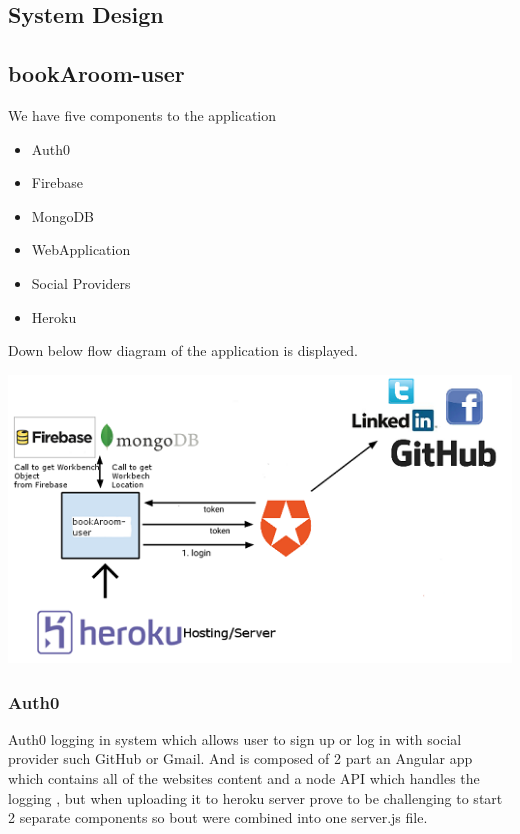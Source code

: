 \begin{itemize}
\chapter{System Design}
\section{bookAroom-user}
\bigbreak

We have five components to the application

\begin{itemize}
	\item Auth0
	\item Firebase
	\item MongoDB
	\item WebApplication 
	\item Social Providers
	\item Heroku
\end{itemize}
\bigbreak

Down below flow diagram of the application is displayed.

\begin{center}    
	\includegraphics{img/userFlow.png}
\end{center}
\bigbreak


\subsection{Auth0}
Auth0 logging in system which allows user to sign up or log in with social provider such GitHub or Gmail. And is composed of 2 part an Angular app which contains all of the websites content and a node API which handles the logging , but when uploading it to heroku server prove to be challenging to start 2 separate components so bout were combined into one server.js file.
\bigbreak


\end{itemize}
